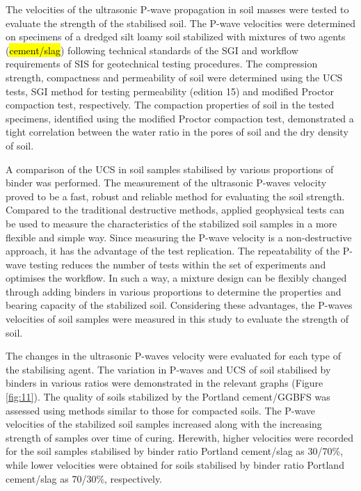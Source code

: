 \documentclass{amestyle}
\begin{document}
The velocities of the ultrasonic P-wave propagation in soil masses were tested to evaluate the strength of the stabilised soil. The P-wave velocities were determined on specimens of a dredged silt loamy soil stabilized with mixtures of two agents (\hl{cement/slag}) following technical standards of the SGI and workflow requirements of SIS for geotechnical testing procedures. The compression strength, compactness and permeability of soil were determined using the UCS tests, SGI method for testing permeability (edition 15) and modified Proctor compaction test, respectively. The compaction properties of soil in the tested specimens, identified using the modified Proctor compaction test, demonstrated a tight correlation between the water ratio in the pores of soil and the dry density of soil.

A comparison of the UCS in soil samples stabilised by various proportions of binder was performed. The measurement of the ultrasonic P-waves velocity proved to be a fast, robust and reliable method for evaluating the soil strength. Compared to the traditional destructive methods, applied geophysical tests can be used to measure the characteristics of the stabilized soil samples in a more flexible and simple way. Since measuring the P-wave velocity is a non-destructive approach, it has the advantage of the test replication. The repeatability of the P-wave testing reduces the number of tests within the set of experiments and optimises the workflow. In such a way, a mixture design can be flexibly changed through adding binders in various proportions to determine the properties and bearing capacity of the stabilized soil. Considering these advantages, the P-waves velocities of soil samples were measured in this study to evaluate the strength of soil. 

The changes in the ultrasonic P-waves velocity were evaluated for each type of the stabilising agent. The variation in P-waves and UCS of soil stabilised by binders in various ratios were demonstrated in the relevant graphs (Figure \ref{fig:11}). The quality of soils stabilized by the Portland cement/GGBFS was assessed using methods similar to those for compacted soils. The P-wave velocities of the stabilized soil samples increased along with the increasing strength of samples over time of curing. Herewith, higher velocities were recorded for the soil samples stabilised by binder ratio Portland cement/slag as 30/70\%, while lower velocities were obtained for soils stabilised by binder ratio Portland cement/slag as 70/30\%, respectively. 
\end{document}
